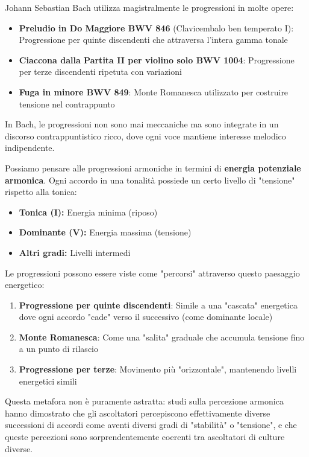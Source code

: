 \begin{esempio}
	\label{ex:bach_progressioni}
	Johann Sebastian Bach utilizza magistralmente le progressioni in molte opere:
	
	\begin{itemize}
		\item \textbf{Preludio in Do Maggiore BWV 846} (Clavicembalo ben temperato I): Progressione per quinte discendenti che attraversa l'intera gamma tonale
		
		\item \textbf{Ciaccona dalla Partita II per violino solo BWV 1004}: Progressione per terze discendenti ripetuta con variazioni
		
		\item \textbf{Fuga in \Dodiesis  minore BWV 849}: Monte Romanesca utilizzato per costruire tensione nel contrappunto
	\end{itemize}
	
	In Bach, le progressioni non sono mai meccaniche ma sono integrate in un discorso contrappuntistico ricco, dove ogni voce mantiene interesse melodico indipendente.
\end{esempio}

\begin{fisica}
	Possiamo pensare alle progressioni armoniche in termini di \textbf{energia potenziale armonica}. Ogni accordo in una tonalità possiede un certo livello di "tensione" rispetto alla tonica:
	
	\begin{itemize}
		\item \textbf{Tonica (I):} Energia minima (riposo)
		\item \textbf{Dominante (V):} Energia massima (tensione)
		\item \textbf{Altri gradi:} Livelli intermedi
	\end{itemize}
	
	Le progressioni possono essere viste come "percorsi" attraverso questo paesaggio energetico:
	
	\begin{enumerate}
		\item \textbf{Progressione per quinte discendenti}: Simile a una "cascata" energetica dove ogni accordo "cade" verso il successivo (come dominante locale)
		
		\item \textbf{Monte Romanesca}: Come una "salita" graduale che accumula tensione fino a un punto di rilascio
		
		\item \textbf{Progressione per terze}: Movimento più "orizzontale", mantenendo livelli energetici simili
	\end{enumerate}
	
	Questa metafora non è puramente astratta: studi sulla percezione armonica hanno dimostrato che gli ascoltatori percepiscono effettivamente diverse successioni di accordi come aventi diversi gradi di "stabilità" o "tensione", e che queste percezioni sono sorprendentemente coerenti tra ascoltatori di culture diverse.
\end{fisica}

